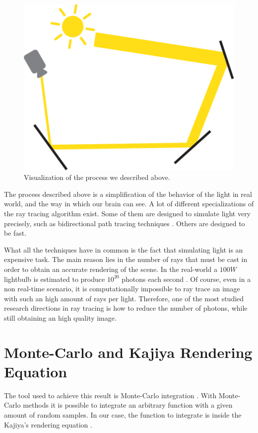 \documentclass{PoliMi_MasterThesis}
\begin{document}
\begin{figure}[H]
    \centering
    \includegraphics[width=\textwidth*\real{0.4}]{Images/ray_tracing_simple.png}
    \caption{Visualization of the process we described above.}
    \label{fig:ray_tracing_intro}
\end{figure}

The process described above is a simplification of the behavior of the light in real world, and the way in which our brain can see. A lot of different specializations of the ray tracing algorithm exist. Some of them are designed to simulate light very precisely, such as bidirectional path tracing techniques \cite{bidirectional_path_tracing}. Others are designed to be fast.

What all the techniques have in common is the fact that simulating light is an expensive task. The main reason lies in the number of rays that must be cast in order to obtain an accurate rendering of the scene. In the real-world a $100W$ lightbulb is estimated to produce $10^{20}$ photons each second \cite{monte_carlo_integration}. Of course, even in a non real-time scenario, it is computationally impossible to ray trace an image with such an high amount of rays per light. Therefore, one of the most studied research directions in ray tracing is how to reduce the number of photons, while still obtaining an high quality image.

\section*{Monte-Carlo and Kajiya Rendering Equation}
The tool used to achieve this result is Monte-Carlo integration \cite{monte_carlo_integration}. With Monte-Carlo methods it is possible to integrate an arbitrary function with a given amount of random samples. In our case, the function to integrate is inside the Kajiya's rendering equation \cite{rendering_equation}.
\end{document}
